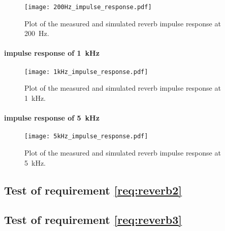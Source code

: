 \begin{figure}[htbp!]
    \centering
        \texttt{[image: 200Hz\_impulse\_response.pdf]}
        \caption{Plot of the measured and simulated \gls{reverb} impulse response at \SI{200}{\hertz}.}
        \label{fig:tests:reverb:200Hz}
  \end{figure}

\paragraph{impulse response of \SI{1}{\kilo\hertz}}

\begin{figure}[htbp!]
    \centering
        \texttt{[image: 1kHz\_impulse\_response.pdf]}
        \caption{Plot of the measured and simulated \gls{reverb} impulse response at \SI{1}{\kilo\hertz}.}
        \label{fig:tests:reverb:1kHz}
  \end{figure}
  
  
 \paragraph{impulse response of \SI{5}{\kilo\hertz}}

\begin{figure}[htbp!]
    \centering
        \texttt{[image: 5kHz\_impulse\_response.pdf]}
        \caption{Plot of the measured and simulated \gls{reverb} impulse response at \SI{5}{\kilo\hertz}.}
        \label{fig:tests:reverb:5kHz}
  \end{figure}
  
  
\subsection{Test of requirement \autoref{req:reverb2}}

\subsection{Test of requirement \autoref{req:reverb3}}

